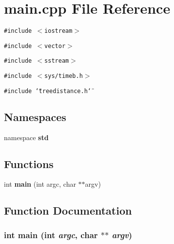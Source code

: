 \section{main.cpp File Reference}
\label{main_8cpp}
{\tt \#include $<$iostream$>$}\par
{\tt \#include $<$vector$>$}\par
{\tt \#include $<$sstream$>$}\par
{\tt \#include $<$sys/timeb.h$>$}\par
{\tt \#include \char`\"{}treedistance.h\char`\"{}}\par
\subsection*{Namespaces}
\begin{CompactItemize}
\item 
namespace {\bf std}
\end{CompactItemize}
\subsection*{Functions}
\begin{CompactItemize}
\item 
int {\bf main} (int argc, char $\ast$$\ast$argv)
\end{CompactItemize}


\subsection{Function Documentation}
\subsubsection{\setlength{\rightskip}{0pt plus 5cm}int main (int {\em argc}, char $\ast$$\ast$ {\em argv})}\label{main_8cpp_a0}



